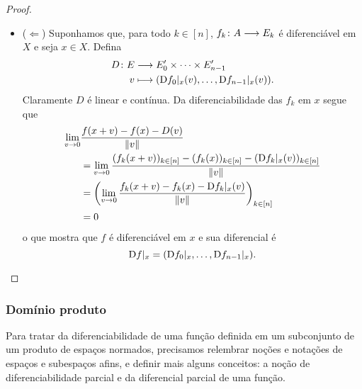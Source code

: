 \begin{proof}
\begin{itemize}
	\item ($\Leftarrow$) Suponhamos que, para todo $k \in [n]$, $f_k\colon \allowbreak A \longrightarrow E_k$ é diferenciável em $X$ e seja $x \in X$. Defina
		\begin{align*}
		{D}\colon {E} &\longrightarrow {E'_0 \times \cdots \times E'_{n-1}} \\{v} &\longmapsto (\mathrm{D} f_0|_x(v), \ldots, \mathrm{D} f_{n-1}|_x(v)).
		\end{align*}
	Claramente $D$ é linear e contínua. Da diferenciabilidade das $f_k$ em $x$ segue que
		\begin{align*}
		\lim_{v \to 0}& \frac{f(x+v) - f(x) - D(v)}{\left\Vert{v}\right\Vert} \\
			&= \lim_{v \to 0} \frac{(f_k(x+v))_{k \in [n]} - (f_k(x))_{k \in [n]} - (\mathrm{D} f_k|_x(v))_{k \in [n]}}{\left\Vert{v}\right\Vert} \\
			&= \left( \lim_{v \to 0} \frac{f_k(x+v) - f_k(x) - \mathrm{D} f_k|_x(v)}{\left\Vert{v}\right\Vert} \right)_{k \in [n]} \\
			&= 0
		\end{align*}
	o que mostra que $f$ é diferenciável em $x$ e sua diferencial é
		\begin{equation*}
		\mathrm{D} f|_x = (\mathrm{D} f_0|_x, \ldots, \mathrm{D} f_{n-1}|_x).
		\qedhere
		\end{equation*}
	\end{itemize}
\end{proof}





\subsubsection{Domínio produto}

Para tratar da diferenciabilidade de uma função definida em um subconjunto de um produto de espaços normados, precisamos relembrar noções e notações de espaços e subespaços afins, e definir mais alguns conceitos: a noção de diferenciabilidade parcial e da diferencial parcial de uma função.

